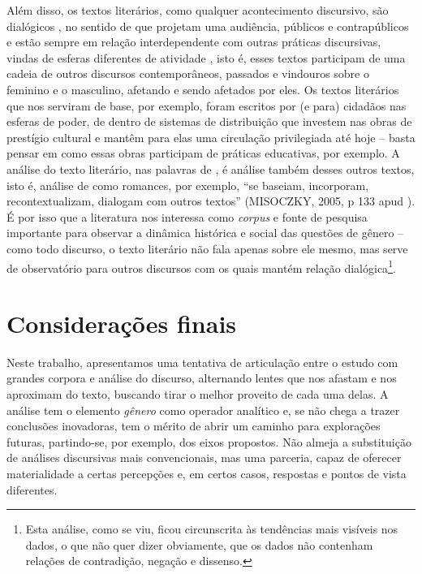 \documentclass[portuguese]{textolivre}
\begin{document}
Além disso, os textos literários, como qualquer acontecimento discursivo, são dialógicos \cite{bakthin1992}, no sentido de que projetam uma audiência, públicos e contrapúblicos e estão sempre em relação interdependente com outras práticas discursivas, vindas de esferas diferentes de atividade \cite{fairclough1992,foucault_ordem_2012}, isto é, esses textos participam de uma cadeia de outros discursos contemporâneos, passados e vindouros sobre o feminino e o masculino, afetando e sendo afetados por eles. Os textos literários que nos serviram de base, por exemplo, foram escritos por (e para) cidadãos nas esferas de poder, de dentro de sistemas de distribuição que investem nas obras de prestígio cultural e mantêm para elas uma circulação privilegiada até hoje – basta pensar em como essas obras participam de práticas educativas, por exemplo. A análise do texto literário, nas palavras de \textcite{mussalim2018}, é análise também desses outros textos, isto é, análise de como romances, por exemplo, “se baseiam, incorporam, recontextualizam, dialogam com outros textos” (MISOCZKY, 2005, p 133 apud \cite{mussalim2018}). 
É por isso que a literatura nos interessa como \textit{corpus} e fonte de pesquisa importante para observar a dinâmica histórica e social das questões de gênero – como todo discurso, o texto literário não fala apenas sobre ele mesmo, mas serve de observatório para outros discursos com os quais mantém relação dialógica\footnote{Esta análise, como se viu, ficou circunscrita às tendências mais visíveis nos dados, o que não quer dizer obviamente, que os dados não contenham relações de contradição, negação e dissenso.}.

\section{Considerações finais}\label{sec-modelo}
Neste trabalho, apresentamos uma tentativa de articulação entre o estudo com grandes corpora e análise do discurso, alternando lentes que nos afastam e nos aproximam do texto, buscando tirar o melhor proveito de cada uma delas. A análise tem o elemento \textit{gênero} como operador analítico e, se não chega a trazer conclusões inovadoras, tem o mérito de abrir um caminho para explorações futuras, partindo-se, por exemplo, dos eixos propostos. Não almeja a substituição de análises discursivas mais convencionais, mas uma parceria, capaz de oferecer materialidade a certas percepções e, em certos casos, respostas e pontos de vista diferentes.
\end{document}

